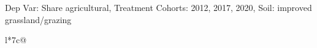 \begin{table}[H]
\captionlistentry[table]{}
\label{table:beaver_land_class_DVis_land_class_1_SCg123_SSIGRG}
\scriptsize %
Dep Var: Share agricultural, Treatment Cohorts: 2012, 2017, 2020, Soil: improved grassland/grazing \\
\begin{threeparttable}
\begin{tabulary}{\textwidth}{l*{7}{c}@{}}
\toprule \toprule
\noalign{\smallskip}
\noalign{\smallskip}
\midrule \bottomrule
\end{tabulary}
\medskip
\end{threeparttable}
\end{table}
